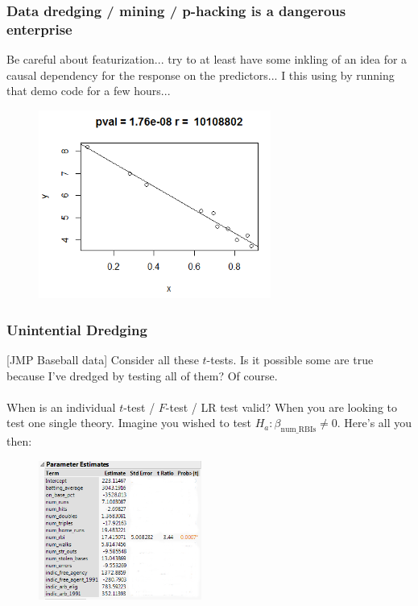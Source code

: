 \documentclass[handout]{beamer}
\begin{document}
\begin{frame}\frametitle{Data dredging / mining / p-hacking is a dangerous enterprise}

\small
Be careful about featurization... try to at least have some inkling of an idea for a causal dependency for the response on the predictors... \pause I  this using by running that demo code for a few hours...
 
\begin{figure}
\centering
\includegraphics[width=3in]{data_mining.png}
\end{figure}
	
\end{frame}

\begin{frame}\frametitle{Unintential Dredging}
\small
[JMP Baseball data] \pause Consider all these $t$-tests. Is it possible some are true because I've dredged by testing all of them? \pause Of course. \\~\\

\pause When is an individual $t$-test / $F$-test / LR test valid? \pause When you are looking to test one single theory. Imagine you wished to test $H_a: \beta_{\text{num\_RBIs}} \neq 0$. Here's all you  then:

\begin{figure}
\centering
\includegraphics[width=2.1in]{baseball_param_ests.png}
\end{figure}

\end{frame}
\end{document}
